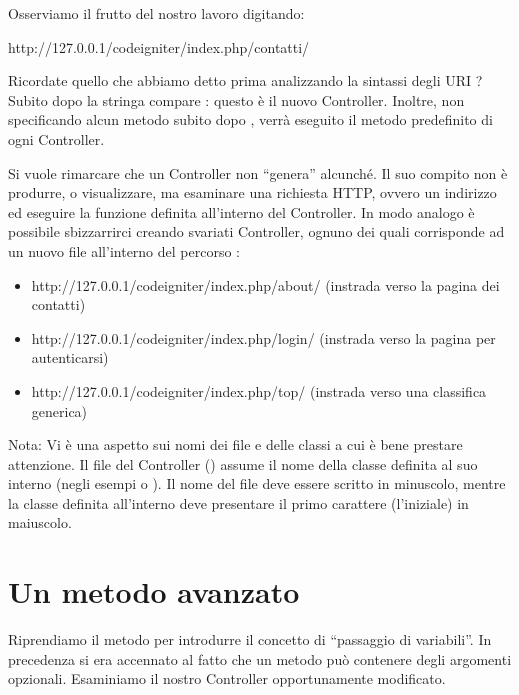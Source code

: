 Osserviamo il frutto del nostro lavoro digitando:

\begin{code}
http://127.0.0.1/codeigniter/index.php/contatti/
\end{code}

Ricordate quello che abbiamo detto prima analizzando la sintassi degli \ac{URI} ? Subito dopo la stringa  compare : questo è il nuovo Controller. Inoltre, non specificando alcun metodo subito dopo , verrà eseguito  il metodo predefinito di ogni Controller.

Si vuole rimarcare che un Controller non ``genera'' alcunché. Il suo compito non è produrre, o visualizzare, ma esaminare una richiesta \ac{HTTP}, ovvero un indirizzo ed eseguire la funzione definita all'interno del Controller. In modo analogo è possibile sbizzarrirci creando svariati Controller, ognuno dei quali corrisponde ad un nuovo file all'interno del percorso :

\begin{itemize}
\item http://127.0.0.1/codeigniter/index.php/about/ (instrada verso la pagina dei contatti)
\item http://127.0.0.1/codeigniter/index.php/login/ (instrada verso la pagina per autenticarsi)
\item http://127.0.0.1/codeigniter/index.php/top/ (instrada verso una classifica generica)
\end{itemize}

Nota: Vi è una aspetto sui nomi dei file e delle classi a cui è bene prestare attenzione. Il file del Controller () assume il nome della classe definita al suo interno (negli esempi  o ). Il nome del file deve essere scritto in minuscolo, mentre la classe definita all'interno deve presentare il primo carattere (l'iniziale) in maiuscolo.

\section*{Un metodo avanzato}
Riprendiamo il metodo  per introdurre il concetto di ``passaggio di variabili''. In precedenza si era accennato al fatto che un metodo può contenere degli argomenti opzionali. Esaminiamo il nostro Controller  opportunamente modificato.

\label{list:primocontroller}

